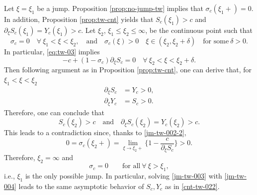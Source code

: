 \documentclass[12pt]{article}
\theoremstyle{definition}
\theoremstyle{remark}
\numberwithin{equation}{section}
\begin{document}
Let $ \xi = \xi_1 $ be a jump. Proposition \ref{prop:no-jump-tw} implies that $ \sigma_c(\xi_1 +) = 0 $. In addition, Proposition \ref{prop:tw-cnt} yields that $ S_c(\xi_1) > c $ and $ \partial_\xi S_c(\xi_1) = Y_c(\xi_1) > c $. Let $ \xi_2 $, $ \xi_1 \leq \xi_2 \leq \infty $, be the continuous point such that 
\begin{equation}
    \label{jm-tw-002}
    \sigma_c = 0 \quad \forall \ \xi_1 < \xi < \xi_2, \quad \text{and} \quad \sigma_c(\xi) > 0 \quad \xi \in (\xi_2,\xi_2 + \delta) \quad \text{for some} \ \delta > 0.  
\end{equation}
In particular, \eqref{eq:tw-03} implies
\begin{equation}
    \label{jm-tw-002-2}
    -c + (1-\sigma_c) \partial_\xi S_c = 0 \quad \forall \ \xi_2 < \xi < \xi_2 + \delta.
\end{equation}
Then following argument as in Proposition \ref{prop:tw-cnt}, one can derive that, for $ \xi_1 < \xi < \xi_2 $
\begin{subequations}
    \label{jm-tw-003}
    \begin{align}
        \partial_\xi S_c & = Y_c >0, \\
        \partial_\xi Y_c & = S_c >0.
    \end{align}
\end{subequations}
Therefore, one can conclude that
\begin{equation}
    \label{jm-tw-004}
    S_c(\xi_2) > c \quad \text{and} \quad \partial_\xi S_c(\xi_2) = Y_c(\xi_2) > c.
\end{equation}
This leads to a contradiction since, thanks to \eqref{jm-tw-002-2},
\begin{equation}
    \label{jm-tw-004-1}
    0 = \sigma_c(\xi_2+) = \lim_{\xi \to \xi_2+} \lbrace 1-\frac{c}{\partial_\xi S_c}\rbrace > 0. 
\end{equation}
Therefore, $ \xi_2 = \infty $ and 
\begin{equation}
    \label{jm-tw-005}
    \sigma_c = 0 \qquad \text{for all} \ \forall \ \xi > \xi_1,
\end{equation}
i.e., $ \xi_1 $ is the only possible jump. In particular, solving \eqref{jm-tw-003} with \eqref{jm-tw-004} leads to 
the same asymptotic behavior of $ S_c, Y_c $ as in \eqref{cnt-tw-022}. 
\end{document}
